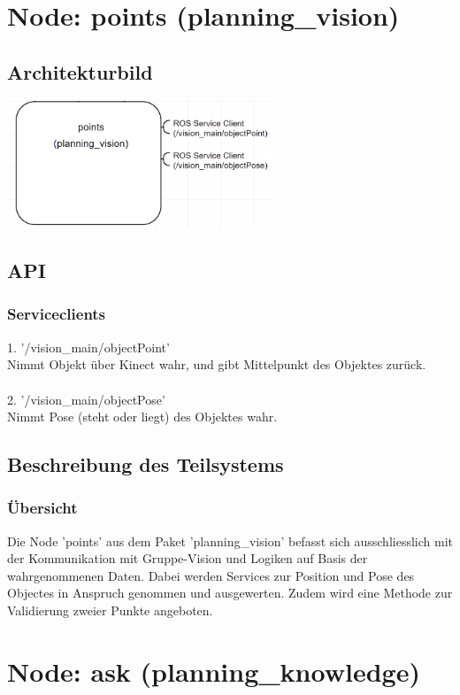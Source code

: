 \documentclass{suturo}
\begin{document}
\section{Node: points (planning\_vision)}
\subsection{Architekturbild}
\begin{center} \includegraphics[width=0.6\textwidth]{img/diag_planning_vision.png} \end{center}
\subsection{API}
\subsubsection{Serviceclients}
1. '/vision\_main/objectPoint' \\
Nimmt Objekt über Kinect wahr, und gibt Mittelpunkt des Objektes zur\"uck.\\ \\
2. '/vision\_main/objectPose' \\
Nimmt Pose (steht oder liegt) des Objektes wahr.
\subsection{Beschreibung des Teilsystems}
\subsubsection{\"Ubersicht}
Die Node 'points' aus dem Paket 'planning\_vision' befasst sich ausschliesslich mit der Kommunikation mit Gruppe-Vision und Logiken auf Basis der wahrgenommenen Daten. Dabei werden Services zur Position und Pose des Objectes in Anspruch genommen und ausgewerten. Zudem wird eine Methode zur Validierung zweier Punkte angeboten.

\section{Node: ask (planning\_knowledge)}
\end{document}
